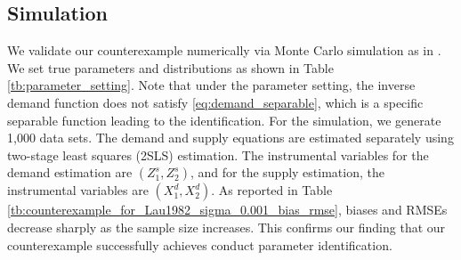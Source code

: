 \documentclass[11pt, a4paper]{article}
\theoremstyle{remark}
\begin{document}
\subsection{Simulation}\label{sec:simulation}
We validate our counterexample numerically via Monte Carlo simulation as in \cite{matsumura2023resolving}.
We set true parameters and distributions as shown in Table \ref{tb:parameter_setting}.
Note that under the parameter setting, the inverse demand function does not satisfy \eqref{eq:demand_separable}, which is a specific separable function leading to the identification.
For the simulation, we generate 1,000 data sets. 
The demand and supply equations are estimated separately using two-stage least squares (2SLS) estimation. The instrumental variables for the demand estimation are $(Z_{1}^{s}, Z_{2}^{s})$, and for the supply estimation, the instrumental variables are $(X_{1}^{d}, X_{2}^{d})$. 
As reported in Table \ref{tb:counterexample_for_Lau1982_sigma_0.001_bias_rmse}, biases and RMSEs decrease sharply as the sample size increases. 
This confirms our finding that our counterexample successfully achieves conduct parameter identification.
\end{document}
